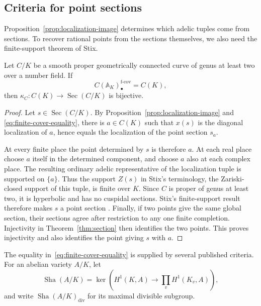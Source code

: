 \subsection{Criteria for point sections}\label{subsec:global-criteria}

Proposition~\ref{prop:localization-image} determines which adelic tuples
come from sections. To recover rational points from the sections
themselves, we also need the finite-support theorem of Stix.

\begin{theorem}\label{thm:global-descent}
Let $C/K$ be a smooth proper geometrically connected curve of genus at
least two over a number field. If
\begin{equation}\label{eq:finite-cover-equality}
 C(\mathbb A_K)_\bullet^{\mathrm{f\text{-}cov}}=C(K),
\end{equation}
then $\kappa_C:C(K)\to\operatorname{Sec}(C/K)$ is bijective.
\end{theorem}

\begin{proof}
Let $s\in\operatorname{Sec}(C/K)$. By
Proposition~\ref{prop:localization-image} and
\eqref{eq:finite-cover-equality}, there is $a\in C(K)$ such that
$x(s)$ is the diagonal localization of $a$, hence equals the
localization of the point section $s_a$.

At every finite place the point determined by $s$ is therefore $a$.
At each real place choose $a$ itself in the determined component,
and choose $a$ also at each complex place. The resulting ordinary
adelic representative of the localization tuple is supported on
$\{a\}$. Thus the support $Z(s)$ in Stix's terminology, the
Zariski-closed support of this tuple, is finite over $K$.
Since $C$ is proper of genus at least two, it is hyperbolic and has no
cuspidal sections. Stix's finite-support result therefore makes $s$
a point section \cite[arXiv version, Section~3 and Corollary~5]{StixFiniteSupport}.
Finally, if two points give the same global section, their sections
agree after restriction to any one finite completion. Injectivity in
Theorem~\ref{thm:section} then identifies the two points. This proves
injectivity and also identifies the point giving $s$ with $a$.
\end{proof}

The equality in~\eqref{eq:finite-cover-equality} is supplied by several
published criteria. For an abelian variety $A/K$, let
\[
 \operatorname{Sha}(A/K)
 =\ker\left(H^1(K,A)\longrightarrow\prod_v H^1(K_v,A)\right),
\]
and write $\operatorname{Sha}(A/K)_{\mathrm{div}}$ for its maximal
divisible subgroup.

